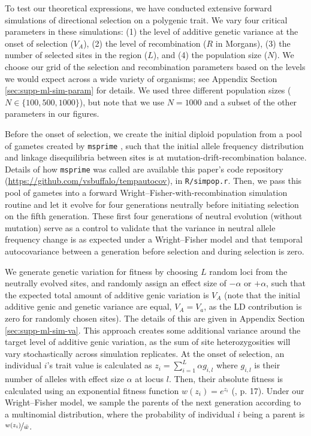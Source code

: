 \documentclass[11pt]{article}
\begin{document}
To test our theoretical expressions, we have conducted extensive forward
simulations of directional selection on a polygenic trait. We vary four
critical parameters in these simulations: (1) the level of additive genetic
variance at the onset of selection ($V_A$), (2) the level of recombination ($R$
in Morgans), (3) the number of selected sites in the region ($L$), and (4) the
population size ($N$). We choose our grid of the selection and recombination
parameters based on the levels we would expect across a wide variety of
organisms; see Appendix Section \ref{sec:supp-ml-sim-param} for details. We
used three different population sizes ($N \in \{100, 500, 1000\}$), but note
that we use $N=1000$ and a subset of the other parameters in our figures.


Before the onset of selection, we create the initial diploid population from a
pool of gametes created by \texttt{msprime} \parencite{Kelleher2016-oi}, such
that the initial allele frequency distribution and linkage disequilibria
between sites is at mutation-drift-recombination balance. Details of how
\texttt{msprime} was called are available this paper's code repository
(\url{https://github.com/vsbuffalo/tempautocov}), in \texttt{R/simpop.r}. Then, we
pass this pool of gametes into a forward Wright--Fisher-with-recombination
simulation routine and let it evolve for four generations neutrally before
initiating selection on the fifth generation.  These first four generations of
neutral evolution (without mutation) serve as a control to validate that the
variance in neutral allele frequency change is as expected under a
Wright--Fisher model and that temporal autocovariance between a generation
before selection and during selection is zero.

We generate genetic variation for fitness by choosing $L$ random loci from the
neutrally evolved sites, and randomly assign an effect size of $-\alpha$ or
$+\alpha$, such that the expected total amount of additive genic variation is
$V_A$ (note that the initial additive genic and genetic variance are equal,
$V_A = V_a$, as the LD contribution is zero for randomly chosen sites). The
details of this are given in Appendix Section \ref{sec:supp-ml-sim-va}. This
approach creates some additional variance around the target level of additive
genic variation, as the sum of site heterozygosities will vary stochastically
across simulation replicates. At the onset of selection, an individual $i$'s
trait value is calculated as $z_i = \sum_{i=1}^L \alpha g_{i,l}$ where
$g_{i,l}$ is their number of alleles with effect size $\alpha$ at locus $l$.
Then, their absolute fitness is calculated using an exponential fitness
function $w(z_i) = e^{z_i}$ (\cite{Turelli1990-kd}, p. 17). Under our
Wright--Fisher model, we sample the parents of the next generation according to
a multinomial distribution, where the probability of individual $i$ being a
parent is $\nicefrac{w(z_i)}{\bar{w}}$. 
\end{document}
